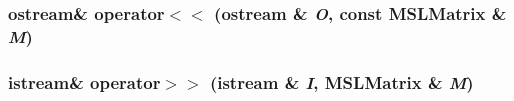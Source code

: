 \subsubsection{\setlength{\rightskip}{0pt plus 5cm}ostream\& operator$<$$<$ (ostream \& {\em O}, const {\bf MSLMatrix} \& {\em M})}\label{matrix_8h_a1}


\subsubsection{\setlength{\rightskip}{0pt plus 5cm}istream\& operator$>$$>$ (istream \& {\em I}, {\bf MSLMatrix} \& {\em M})}\label{matrix_8h_a2}


